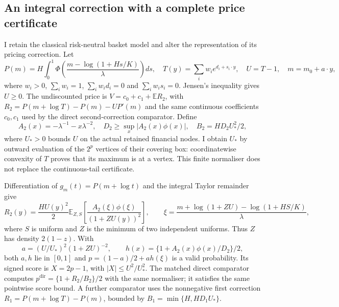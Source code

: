 \subsection{An integral correction with a complete price certificate}
\label{sec:integral-core-certificate}

I retain the classical risk-neutral basket model and alter the representation
of its pricing correction.  Let
\[
 P(m)=H\int_0^1\Phi\!\left(\frac{m-\log(1+Hs/K)}{\lambda}\right)ds,
 \quad T(y)=\sum_iw_ie^{d_i+s_i\cdot y},\quad U=T-1,\quad m=m_0+a\cdot y,
\]
where $w_i>0$, $\sum_iw_i=1$, $\sum_iw_id_i=0$ and $\sum_iw_is_i=0$.
Jensen's inequality gives $U\geq0$.  The undiscounted price is
$V=c_0+c_1+\mathbb E R_2$, with
$R_2=P(m+\log T)-P(m)-UP'(m)$ and the same continuous coefficients
$c_0,c_1$ used by the direct second-correction comparator.  Define
\[
 A_2(x)=-\lambda^{-1}-x\lambda^{-2},\quad
 D_2\geq\sup_x|A_2(x)\phi(x)|,\quad
 B_2=HD_2U_*^2/2,
\]
where $U_*>0$ bounds $U$ on the actual retained financial nodes.  I obtain
$U_*$ by outward evaluation of the $2^p$ vertices of their covering box:
coordinatewise convexity of $T$ proves that its maximum is at a vertex.
This finite normaliser does not replace the continuous-tail certificate.

Differentiation of $g_m(t)=P(m+\log t)$ and the integral Taylor remainder give
\begin{equation}
 R_2(y)=\frac{HU(y)^2}{2}\mathbb E_{Z,S}
 \left[\frac{A_2(\xi)\phi(\xi)}{(1+ZU(y))^2}\right],\qquad
 \xi=\frac{m+\log(1+ZU)-\log(1+HS/K)}{\lambda},
 \label{eq:core-integral-correction}
\end{equation}
where $S$ is uniform and $Z$ is the minimum of two independent uniforms.
Thus $Z$ has density $2(1-z)$.  With
\[
 a=(U/U_*)^2(1+ZU)^{-2},\qquad
 h(x)=\{1+A_2(x)\phi(x)/D_2\}/2,
\]
both $a,h$ lie in $[0,1]$ and
$p=(1-a)/2+ah(\xi)$ is a valid probability.
Its signed score is $X=2p-1$, with
$|X|\leq U^2/U_*^2$.  The matched direct comparator computes
$p^{\mathrm{dir}}=\{1+R_2/B_2\}/2$ with the same normaliser; it satisfies
the same pointwise score bound.  A further comparator uses the nonnegative
first correction $R_1=P(m+\log T)-P(m)$, bounded by
$B_1=\min\{H,HD_1U_*\}$.

